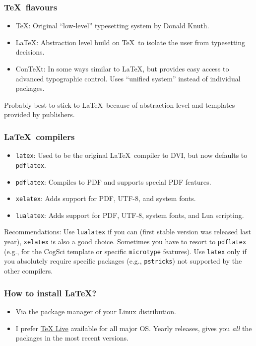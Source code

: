\documentclass[aspectratio=1610,hyperref={colorlinks,linkcolor=}]{beamer}
\newcommand{\cmd}[1]{\texttt{#1}}
\newcommand{\pkg}[1]{\texttt{#1}}
\begin{document}
\begin{frame}
    \frametitle{\TeX\ flavours}
    \begin{itemize}
        \item \TeX\@: Original ``low-level'' typesetting system by Donald Knuth.
        \item \LaTeX\@: Abstraction level build on \TeX\ to isolate the user from typesetting decisions.
        \item ConTeXt\@: In some ways similar to \LaTeX, but provides easy access to advanced typographic control. Uses ``unified system'' instead of individual packages.
    \end{itemize}
    Probably best to stick to \LaTeX\ because of abstraction level and templates provided by publishers.
\end{frame}

\begin{frame}
    \frametitle{\LaTeX\ compilers}
    \begin{itemize}
        \item \cmd{latex}: Used to be the original \LaTeX\ compiler to DVI\@, but now defaults to \cmd{pdflatex}.
        \item \cmd{pdflatex}: Compiles to PDF and supports special PDF features.
        \item \cmd{xelatex}: Adds support for PDF, UTF-8, and system fonts.
        \item \cmd{lualatex}: Adds support for PDF, UTF-8, system fonts, and Lua scripting.
    \end{itemize}
    Recommendations: Use \cmd{lualatex} if you can (first stable version was released last year), \cmd{xelatex} is also a good choice. Sometimes you have to resort to \cmd{pdflatex} (e.g., for the CogSci template or specific \pkg{microtype} features).  Use \cmd{latex} only if you absolutely require specific packages (e.g., \pkg{pstricks}) not supported by the other compilers.
\end{frame}

\begin{frame}
    \frametitle{How to install \LaTeX?}
    \begin{itemize}
        \item Via the package manager of your Linux distribution.
        \item I prefer \href{https://www.tug.org/texlive/}{TeX Live} available for all major OS\@.  Yearly releases, gives you \emph{all} the packages in the most recent versions.
    \end{itemize}
\end{frame}
\end{document}
